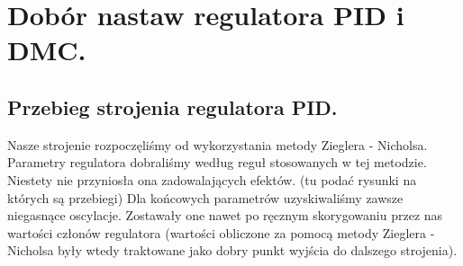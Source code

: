 \chapter{Dobór nastaw regulatora PID i DMC.}
\label{pro4}


\section{Przebieg strojenia regulatora PID.}
Nasze strojenie rozpoczęliśmy od wykorzystania metody Zieglera - Nicholsa. Parametry regulatora dobraliśmy według reguł stosowanych w tej metodzie. Niestety nie przyniosła ona zadowalających efektów. (tu podać rysunki na których są przebiegi) Dla końcowych parametrów uzyskiwaliśmy zawsze niegasnące oscylacje. Zostawały one nawet po ręcznym skorygowaniu przez nas wartości członów regulatora (wartości obliczone za pomocą metody Zieglera - Nicholsa były wtedy traktowane jako dobry punkt wyjścia do dalszego strojenia). 